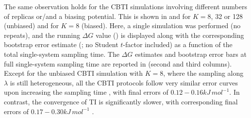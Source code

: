 The same observation holds for the CBTI simulations involving different 
numbers of replicas or/and a biasing potential. This is shown in  and 
for $K=8$, 32 or 128 (unbiased) and for $K=8$ (biased). Here, a single simulation
was performed (no repeats), and the running $\Delta G$ value ()
is displayed along with the corresponding bootstrap error estimate
(; no Student $t$-factor included) as a function of the total single-system
sampling time.
%
The $\Delta G$ estimates and bootstrap error bars 
at full single-system sampling time  are 
reported in  (second and third columns).
%
Except for the unbiased CBTI simulation with $K=8$,
where the sampling along $\lambda$ is still heterogeneous,
all the CBTI protocols follow very similar error curves upon increasing
the sampling time , with final errors of $0.12-0.16\unit{kJ\,mol^{-1}}$.
%
In contrast, the convergence of TI is significantly slower,
with corresponding final errors of $0.17-0.30\unit{kJ\,mol^{-1}}$ .
%


